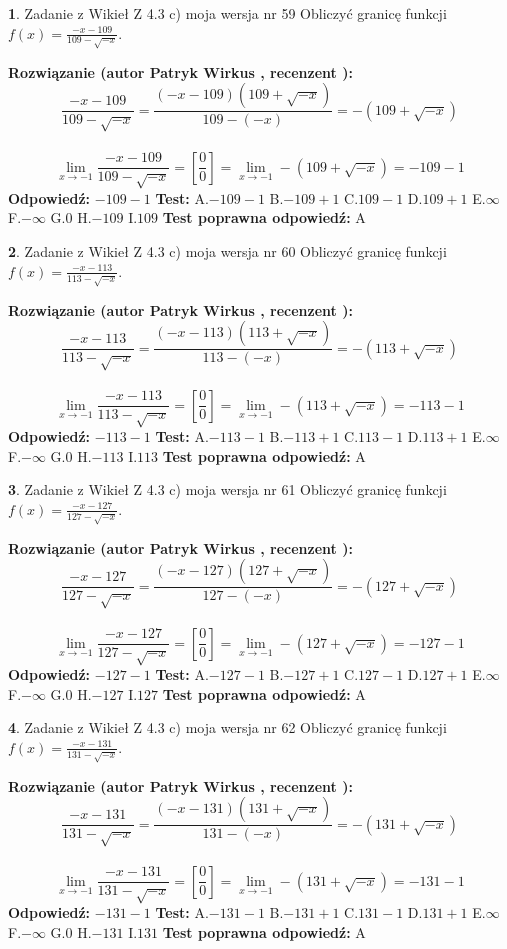 \documentclass[12pt, a4paper]{article}
\theoremstyle{definition} %
\newtheorem{zad}{}
\newcommand{\zadStart}[1]{\begin{zad}#1\newline}
\newcommand{\zadStop}{\end{zad}}
\newcommand{\rozwStart}[2]{\noindent \textbf{Rozwiązanie (autor #1 , recenzent #2): }\newline}
\newcommand{\rozwStop}{\newline}
\newcommand{\odpStart}{\noindent \textbf{Odpowiedź:}\newline}
\newcommand{\odpStop}{\newline}
\newcommand{\testStart}{\noindent \textbf{Test:}\newline}
\newcommand{\testStop}{\newline}
\newcommand{\kluczStart}{\noindent \textbf{Test poprawna odpowiedź:}\newline}
\newcommand{\kluczStop}{\newline}
\begin{document}
\zadStart{Zadanie z Wikieł Z 4.3 c) moja wersja nr 59}
Obliczyć granicę funkcji $f(x)=\frac{-x-109}{109-\sqrt{-x}}$.
\zadStop
\rozwStart{Patryk Wirkus}{}
$$\frac{-x-109}{109-\sqrt{-x}}=\frac{(-x-109)(109+\sqrt{-x})}{109-(-x)}=-(109+\sqrt{-x})$$
\\
$$\lim\limits_{x\to-1}\frac{-x-109}{109-\sqrt{-x}}=[\frac{0}{0}]=\lim\limits_{x\to-1}-(109+\sqrt{-x}) =-109-1$$
\rozwStop
\odpStart
$-109-1$
\odpStop
\testStart
A.$-109-1$
B.$-109+1$
C.$109-1$
D.$109+1$
E.$\infty$
F.$-\infty$
G.$0$
H.$-109$
I.$109$
\testStop
\kluczStart
A
\kluczStop



\zadStart{Zadanie z Wikieł Z 4.3 c) moja wersja nr 60}
Obliczyć granicę funkcji $f(x)=\frac{-x-113}{113-\sqrt{-x}}$.
\zadStop
\rozwStart{Patryk Wirkus}{}
$$\frac{-x-113}{113-\sqrt{-x}}=\frac{(-x-113)(113+\sqrt{-x})}{113-(-x)}=-(113+\sqrt{-x})$$
\\
$$\lim\limits_{x\to-1}\frac{-x-113}{113-\sqrt{-x}}=[\frac{0}{0}]=\lim\limits_{x\to-1}-(113+\sqrt{-x}) =-113-1$$
\rozwStop
\odpStart
$-113-1$
\odpStop
\testStart
A.$-113-1$
B.$-113+1$
C.$113-1$
D.$113+1$
E.$\infty$
F.$-\infty$
G.$0$
H.$-113$
I.$113$
\testStop
\kluczStart
A
\kluczStop



\zadStart{Zadanie z Wikieł Z 4.3 c) moja wersja nr 61}
Obliczyć granicę funkcji $f(x)=\frac{-x-127}{127-\sqrt{-x}}$.
\zadStop
\rozwStart{Patryk Wirkus}{}
$$\frac{-x-127}{127-\sqrt{-x}}=\frac{(-x-127)(127+\sqrt{-x})}{127-(-x)}=-(127+\sqrt{-x})$$
\\
$$\lim\limits_{x\to-1}\frac{-x-127}{127-\sqrt{-x}}=[\frac{0}{0}]=\lim\limits_{x\to-1}-(127+\sqrt{-x}) =-127-1$$
\rozwStop
\odpStart
$-127-1$
\odpStop
\testStart
A.$-127-1$
B.$-127+1$
C.$127-1$
D.$127+1$
E.$\infty$
F.$-\infty$
G.$0$
H.$-127$
I.$127$
\testStop
\kluczStart
A
\kluczStop



\zadStart{Zadanie z Wikieł Z 4.3 c) moja wersja nr 62}
Obliczyć granicę funkcji $f(x)=\frac{-x-131}{131-\sqrt{-x}}$.
\zadStop
\rozwStart{Patryk Wirkus}{}
$$\frac{-x-131}{131-\sqrt{-x}}=\frac{(-x-131)(131+\sqrt{-x})}{131-(-x)}=-(131+\sqrt{-x})$$
\\
$$\lim\limits_{x\to-1}\frac{-x-131}{131-\sqrt{-x}}=[\frac{0}{0}]=\lim\limits_{x\to-1}-(131+\sqrt{-x}) =-131-1$$
\rozwStop
\odpStart
$-131-1$
\odpStop
\testStart
A.$-131-1$
B.$-131+1$
C.$131-1$
D.$131+1$
E.$\infty$
F.$-\infty$
G.$0$
H.$-131$
I.$131$
\testStop
\kluczStart
A
\kluczStop
\end{document}
